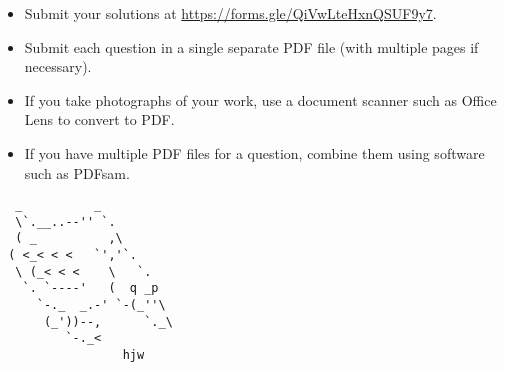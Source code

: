 \documentclass{article}
\begin{document}
\vfill
\begin{itemize}
	\item Submit your solutions at \url{https://forms.gle/QiVwLteHxnQSUF9y7}.
	\item Submit each question in a single separate PDF file (with multiple pages if necessary).
	\item If you take photographs of your work, use a document scanner such as Office Lens to convert to PDF.
	\item If you have multiple PDF files for a question, combine them using software such as PDFsam.
\end{itemize}

\vfill
\centering
\begin{BVerbatim}
  _          _
  \`.__..--'' `.
  ( _          ,\
 ( <_< < <   `','`.
  \ (_< < <    \   `.
   `. `----'   (  q _p
     `-._  _.-' `-(_''\
      (_'))--,      `._\
         `-._<
                 hjw
\end{BVerbatim}
\end{document}
